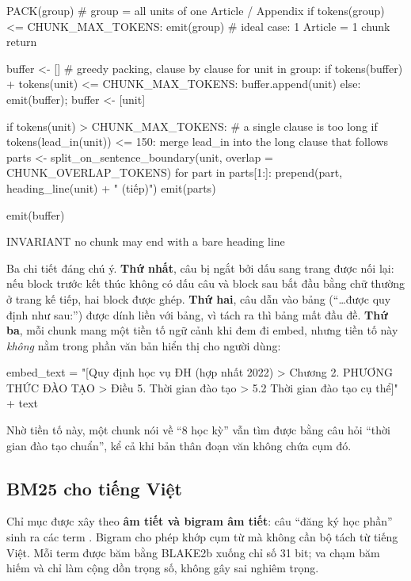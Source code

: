 \begin{codeblock}
PACK(group)                      # group = all units of one Article / Appendix
  if tokens(group) <= CHUNK_MAX_TOKENS:
      emit(group)                                  # ideal case: 1 Article = 1 chunk
      return

  buffer <- []                                     # greedy packing, clause by clause
  for unit in group:
      if tokens(buffer) + tokens(unit) <= CHUNK_MAX_TOKENS:
          buffer.append(unit)
      else:
          emit(buffer); buffer <- [unit]

      if tokens(unit) > CHUNK_MAX_TOKENS:          # a single clause is too long
          if tokens(lead_in(unit)) <= 150:
              merge lead_in into the long clause that follows
          parts <- split_on_sentence_boundary(unit,
                       overlap = CHUNK_OVERLAP_TOKENS)
          for part in parts[1:]:
              prepend(part, heading_line(unit) + " (tiếp)")
          emit(parts)

  emit(buffer)

INVARIANT  no chunk may end with a bare heading line
\end{codeblock}

Ba chi tiết đáng chú ý. \textbf{Thứ nhất}, câu bị ngắt bởi dấu sang trang được nối lại: nếu
block trước kết thúc không có dấu câu và block sau bắt đầu bằng chữ thường ở trang kế tiếp, hai
block được ghép. \textbf{Thứ hai}, câu dẫn vào bảng (“…được quy định như sau:”) được dính liền
với bảng, vì tách ra thì bảng mất đầu đề. \textbf{Thứ ba}, mỗi chunk mang một tiền tố ngữ cảnh
khi đem đi embed, nhưng tiền tố này \emph{không} nằm trong phần văn bản hiển thị cho người
dùng:

\begin{codeblock}
embed_text = "[Quy định học vụ ĐH (hợp nhất 2022) > Chương 2. PHƯƠNG THỨC ĐÀO TẠO
              > Điều 5. Thời gian đào tạo > 5.2 Thời gian đào tạo cụ thể]" + text
\end{codeblock}

Nhờ tiền tố này, một chunk nói về “8 học kỳ” vẫn tìm được bằng câu hỏi “thời gian đào tạo
chuẩn”, kể cả khi bản thân đoạn văn không chứa cụm đó.

\subsection{BM25 cho tiếng Việt}

Chỉ mục được xây theo \textbf{âm tiết và bigram âm tiết}: câu “đăng ký học phần” sinh ra các
term . Bigram cho phép khớp cụm từ mà
không cần bộ tách từ tiếng Việt. Mỗi term được băm bằng BLAKE2b xuống chỉ số 31 bit; va chạm
băm hiếm và chỉ làm cộng dồn trọng số, không gây sai nghiêm trọng.

